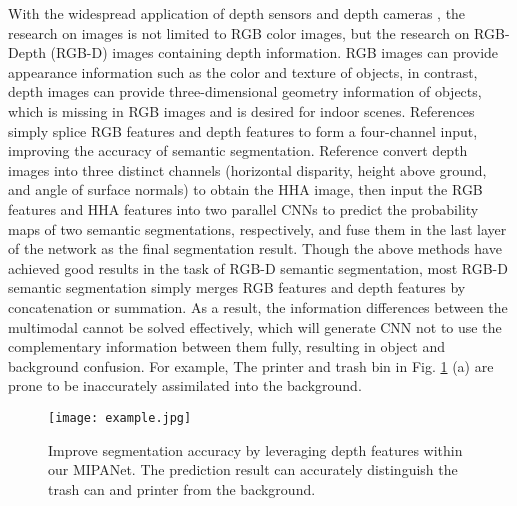 \documentclass{aims}
\numberwithin{equation}{section}
\begin{document}
With the widespread application of depth sensors and depth cameras \cite{zhang2012microsoft}, the research on images is not limited to RGB color images, but the research on RGB-Depth (RGB-D) images containing depth information. RGB images can provide appearance information such as the color and texture of objects, in contrast, depth images can provide three-dimensional geometry information of objects, which is missing in RGB images and is desired for indoor scenes. References \cite{he2017std2p,couprie2013indoor} simply splice RGB features and depth features to form a four-channel input, improving the accuracy of semantic segmentation. Reference \cite{gupta2014learning} convert depth images into three distinct channels (horizontal disparity, height above ground, and angle of surface normals) to obtain the HHA image, then input the RGB features and HHA features into two parallel CNNs to predict the probability maps of two semantic segmentations, respectively, and fuse them in the last layer of the network as the final segmentation result. Though the above methods have achieved good results in the task of RGB-D semantic segmentation, most RGB-D semantic segmentation \cite{park2017rdfnet,jiang2018rednet,eigen2015predicting,wang2014multi} simply merges RGB features and depth features by concatenation or summation. As a result, the information differences between the multimodal cannot be solved effectively, which will generate CNN not to use the complementary information between them fully, resulting in object and background confusion. For example, The printer and trash bin in Fig. \ref{fig:example} (a) are prone to be inaccurately assimilated into the background.

\begin{figure}[t]
	\centering
		\centering
\centering
\texttt{[image: example.jpg]}
\caption{Improve segmentation accuracy by leveraging depth features within our MIPANet. The prediction result can accurately distinguish the trash can and printer from the background.\label{fig:example}}
\end{figure}
\end{document}
